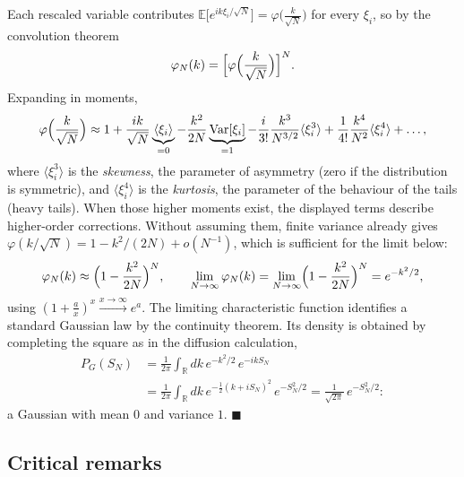 Each rescaled variable contributes $\mathbb{E}\bigl[e^{ik\xi_i/\sqrt{N}}\bigr]=\varphi\bigl(\tfrac{k}{\sqrt{N}}\bigr)$ for every $\xi_i$, so by the convolution theorem
\begin{equation}
\varphi_N(k) = \Bigl[\varphi\Bigl(\frac{k}{\sqrt{N}}\Bigr)\Bigr]^{N}.
\end{equation}
Expanding in moments,
\begin{equation}
\varphi\Bigl(\frac{k}{\sqrt{N}}\Bigr) \approx 1 + \frac{ik}{\sqrt{N}}\underbrace{\langle\xi_i\rangle}_{=0} - \frac{k^2}{2N}\underbrace{\mathrm{Var}[\xi_i]}_{=1} - \frac{i}{3!}\frac{k^3}{N^{3/2}}\langle\xi_i^3\rangle + \frac{1}{4!}\frac{k^4}{N^2}\langle\xi_i^4\rangle + \dots,
\end{equation}
where $\langle\xi_i^3\rangle$ is the \emph{skewness}, the parameter of asymmetry (zero if the distribution is symmetric), and $\langle\xi_i^4\rangle$ is the \emph{kurtosis}, the parameter of the behaviour of the tails (heavy tails).
When those higher moments exist, the displayed terms describe higher-order corrections.
Without assuming them, finite variance already gives $\varphi(k/\sqrt N)=1-k^2/(2N)+o(N^{-1})$, which is sufficient for the limit below:
\begin{equation}
\varphi_N(k) \approx \Bigl(1-\frac{k^2}{2N}\Bigr)^{N},
\qquad
\lim_{N\to\infty}\varphi_N(k) = \lim_{N\to\infty}\Bigl(1-\frac{k^2}{2N}\Bigr)^{N} = e^{-k^2/2},
\end{equation}
using $(1+\tfrac{a}{x})^x\xrightarrow{x\to\infty}e^a$.
The limiting characteristic function identifies a standard Gaussian law by the continuity theorem.
Its density is obtained by completing the square as in the diffusion calculation,
\begin{equation}\begin{split}
P_G(S_N) &= \frac{1}{2\pi}\int_{\mathbb{R}} dk\, e^{-k^2/2}\,e^{-ikS_N}\\
&= \frac{1}{2\pi}\int_{\mathbb{R}} dk\, e^{-\frac{1}{2}(k+iS_N)^2}\,e^{-S_N^2/2}
= \frac{1}{\sqrt{2\pi}}\,e^{-S_N^2/2}:
\end{split}\end{equation}
a Gaussian with mean $0$ and variance $1$. $\blacksquare$

\subsection{Critical remarks}

